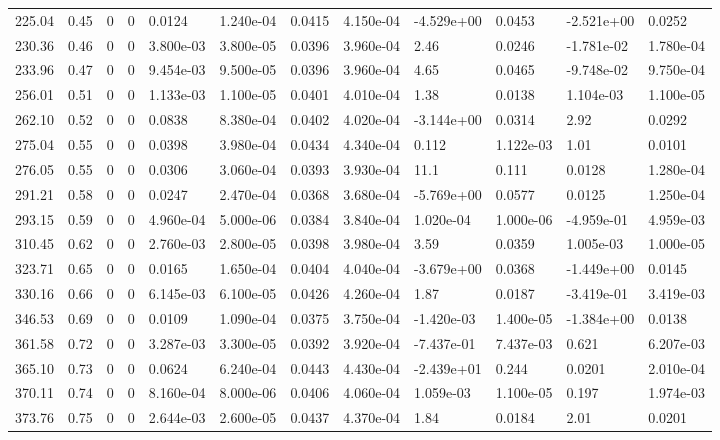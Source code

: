 \documentclass[preview]{standalone}
\begin{document}
{{\begin{tabular}{L{1.2cm}C{1.2cm} C{0.3cm}C{0.5cm} C{1.4cm}C{1.4cm} C{1.4cm}C{1.4cm} C{1.6cm}C{1.6cm} C{1.6cm}C{1.6cm}}
  225.04  &  0.45  & 0     &  0 &  0.0124  & 1.240e-04  &  0.0415&   4.150e-04& -4.529e+00 & 0.0453   &  -2.521e+00 & 0.0252  \\ 
  230.36  &  0.46  & 0     &  0 &  3.800e-03  & 3.800e-05  &  0.0396&   3.960e-04& 2.46 & 0.0246   &  -1.781e-02 & 1.780e-04  \\ 
  233.96  &  0.47  & 0     &  0 &  9.454e-03  & 9.500e-05  &  0.0396&   3.960e-04& 4.65 & 0.0465   &  -9.748e-02 & 9.750e-04  \\ 
  256.01  &  0.51  & 0     &  0 &  1.133e-03  & 1.100e-05  &  0.0401&   4.010e-04& 1.38 & 0.0138   &  1.104e-03 & 1.100e-05  \\ 
  262.10  &  0.52  & 0     &  0 &  0.0838  & 8.380e-04  &  0.0402&   4.020e-04& -3.144e+00 & 0.0314   &  2.92 & 0.0292  \\ 
  275.04  &  0.55  & 0     &  0 &  0.0398  & 3.980e-04  &  0.0434&   4.340e-04& 0.112 & 1.122e-03   &  1.01 & 0.0101  \\ 
  276.05  &  0.55  & 0     &  0 &  0.0306  & 3.060e-04  &  0.0393&   3.930e-04& 11.1 & 0.111   &  0.0128 & 1.280e-04  \\ 
  291.21  &  0.58  & 0     &  0 &  0.0247  & 2.470e-04  &  0.0368&   3.680e-04& -5.769e+00 & 0.0577   &  0.0125 & 1.250e-04  \\ 
  293.15  &  0.59  & 0     &  0 &  4.960e-04  & 5.000e-06  &  0.0384&   3.840e-04& 1.020e-04 & 1.000e-06   &  -4.959e-01 & 4.959e-03  \\ 
  310.45  &  0.62  & 0     &  0 &  2.760e-03  & 2.800e-05  &  0.0398&   3.980e-04& 3.59 & 0.0359   &  1.005e-03 & 1.000e-05  \\ 
  323.71  &  0.65  & 0     &  0 &  0.0165  & 1.650e-04  &  0.0404&   4.040e-04& -3.679e+00 & 0.0368   &  -1.449e+00 & 0.0145  \\ 
  330.16  &  0.66  & 0     &  0 &  6.145e-03  & 6.100e-05  &  0.0426&   4.260e-04& 1.87 & 0.0187   &  -3.419e-01 & 3.419e-03  \\ 
  346.53  &  0.69  & 0     &  0 &  0.0109  & 1.090e-04  &  0.0375&   3.750e-04& -1.420e-03 & 1.400e-05   &  -1.384e+00 & 0.0138  \\ 
  361.58  &  0.72  & 0     &  0 &  3.287e-03  & 3.300e-05  &  0.0392&   3.920e-04& -7.437e-01 & 7.437e-03   &  0.621 & 6.207e-03  \\ 
  365.10  &  0.73  & 0     &  0 &  0.0624  & 6.240e-04  &  0.0443&   4.430e-04& -2.439e+01 & 0.244   &  0.0201 & 2.010e-04  \\ 
  370.11  &  0.74  & 0     &  0 &  8.160e-04  & 8.000e-06  &  0.0406&   4.060e-04& 1.059e-03 & 1.100e-05   &  0.197 & 1.974e-03  \\ 
  373.76  &  0.75  & 0     &  0 &  2.644e-03  & 2.600e-05  &  0.0437&   4.370e-04& 1.84 & 0.0184   &  2.01 & 0.0201  \\ 
\hline 
\end{tabular} 

}}
\end{document}
